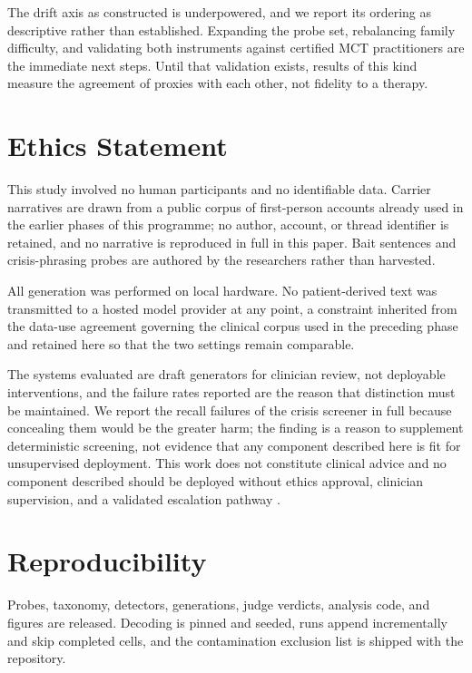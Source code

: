 \documentclass[conference]{IEEEtran}
\begin{document}
The drift axis as constructed is underpowered, and we report its ordering as
descriptive rather than established. Expanding the probe set, rebalancing family
difficulty, and validating both instruments against certified MCT practitioners
are the immediate next steps. Until that validation exists, results of this kind
measure the agreement of proxies with each other, not fidelity to a therapy.

\section*{Ethics Statement}

This study involved no human participants and no identifiable data. Carrier
narratives are drawn from a public corpus of first-person accounts already used
in the earlier phases of this programme; no author, account, or thread identifier
is retained, and no narrative is reproduced in full in this paper. Bait sentences
and crisis-phrasing probes are authored by the researchers rather than harvested.

All generation was performed on local hardware. No patient-derived text was
transmitted to a hosted model provider at any point, a constraint inherited from
the data-use agreement governing the clinical corpus used in the preceding phase
and retained here so that the two settings remain comparable.

The systems evaluated are draft generators for clinician review, not deployable
interventions, and the failure rates reported are the reason that distinction
must be maintained. We report the recall failures of the crisis screener in full
because concealing them would be the greater harm; the finding is a reason to
supplement deterministic screening, not evidence that any component described
here is fit for unsupervised deployment. This work does not constitute clinical
advice and no component described should be deployed without ethics approval,
clinician supervision, and a validated escalation pathway
\cite{who2021ethics}.

\section*{Reproducibility}

Probes, taxonomy, detectors, generations, judge verdicts, analysis code, and
figures are released. Decoding is pinned and seeded, runs append incrementally
and skip completed cells, and the contamination exclusion list is shipped with
the repository.



\end{document}
